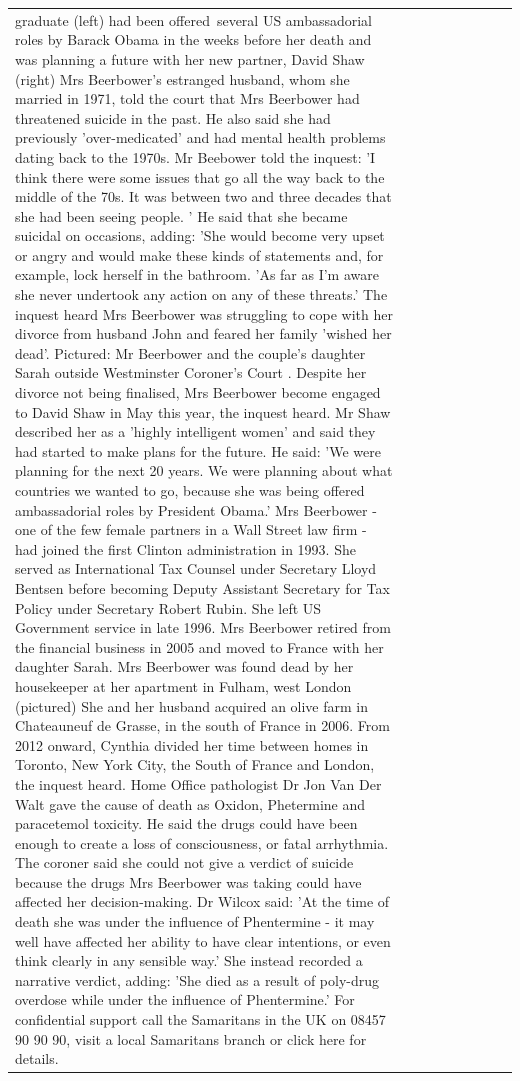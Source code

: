 \begin{table}[H]
\begin{tabular}{lllrlllll}
graduate (left) had been offered several US ambassadorial roles by Barack Obama in the weeks before her death and was planning a future with her new partner, David Shaw (right) Mrs Beerbower's estranged husband, whom she married in 1971, told the court that Mrs Beerbower had threatened suicide in the past. He also said she had previously 'over-medicated' and had mental health problems dating back to the 1970s. Mr Beebower told the inquest: 'I think there were some issues that go all the way back to the middle of the 70s. It was between two and three decades that she had been seeing people. ' He said that she became suicidal on occasions, adding: 'She would become very upset or angry and would make these kinds of statements and, for example, lock herself in the bathroom. 'As far as I'm aware she never undertook any action on any of these threats.' The inquest heard Mrs Beerbower was struggling to cope with her divorce from husband John and feared her family 'wished her dead'. Pictured: Mr Beerbower and the couple's daughter Sarah outside Westminster Coroner's Court . Despite her divorce not being finalised, Mrs Beerbower become engaged to David Shaw in May this year, the inquest heard. Mr Shaw described her as a 'highly intelligent women' and said they had started to make plans for the future. He said: 'We were planning for the next 20 years. We were planning about what countries we wanted to go, because she was being offered ambassadorial roles by President Obama.' Mrs Beerbower - one of the few female partners in a Wall Street law firm - had joined the first Clinton administration in 1993. She served as International Tax Counsel under Secretary Lloyd Bentsen before becoming Deputy Assistant Secretary for Tax Policy under Secretary Robert Rubin. She left US Government service in late 1996. Mrs Beerbower retired from the financial business in 2005 and moved to France with her daughter Sarah. Mrs Beerbower was found dead by her housekeeper at her apartment in Fulham, west London (pictured) She and her husband acquired an olive farm in Chateauneuf de Grasse, in the south of France in 2006. From 2012 onward, Cynthia divided her time between homes in Toronto, New York City, the South of France and London, the inquest heard. Home Office pathologist Dr Jon Van Der Walt gave the cause of death as Oxidon, Phetermine and paracetemol toxicity. He said the drugs could have been enough to create a loss of consciousness, or fatal arrhythmia. The coroner said she could not give a verdict of suicide because the drugs Mrs Beerbower was taking could have affected her decision-making. Dr Wilcox said: 'At the time of death she was under the influence of Phentermine - it may well have affected her ability to have clear intentions, or even think clearly in any sensible way.' She instead recorded a narrative verdict, adding: 'She died as a result of poly-drug overdose while under the influence of Phentermine.' For confidential support call the Samaritans in the UK on 08457 90 90 90, visit a local Samaritans branch or click here for details.


\end{tabular}
\end{table}
